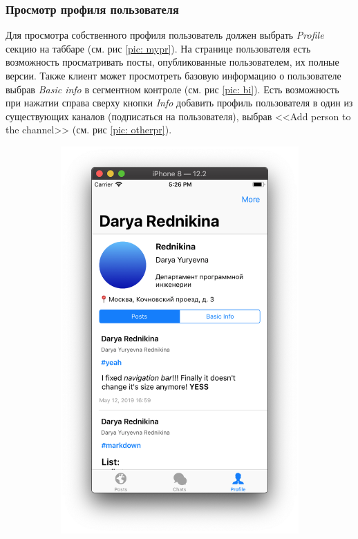 \documentclass[a4paper,12pt]{article}
\begin{document}
	\subsubsection{Просмотр профиля пользователя}
	Для просмотра собственного профиля пользователь должен выбрать \textit{Profile} секцию на таббаре (см. рис \ref{pic: mypr}). На странице пользователя есть возможность просматривать посты, опубликованные пользователем, их полные версии. Также клиент может просмотреть базовую информацию о пользователе выбрав \textit{Basic info} в сегментном контроле (см. рис \ref{pic: bi}). Есть возможность при нажатии справа сверху кнопки \textit{Info} добавить профиль пользователя в один из существующих каналов (подписаться на пользователя), выбрав <<Add person to the channel>> (см. рис \ref{pic: otherpr}).
		\begin{figure}[h!]
		\centering
		\begin{subfigure}[b]{0.3\linewidth}
			\includegraphics[width=\linewidth]{../includes/pmi/profile.png}

\end{subfigure}
\end{figure}
\end{document}
